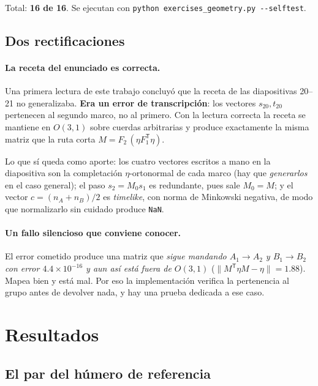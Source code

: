 \documentclass[11pt,a4paper]{article}
\newcommand{\Ot}{\ensuremath{O(3,1)}}
\begin{document}
\noindent Total: \textbf{16 de 16}. Se ejecutan con
\texttt{python exercises\_geometry.py -{}-selftest}.

\subsection{Dos rectificaciones}

\paragraph{La receta del enunciado es correcta.} Una primera lectura de este trabajo
concluyó que la receta de las diapositivas 20--21 no generalizaba. \textbf{Era un error de
transcripción}: los vectores $s_{20}, t_{20}$ pertenecen al segundo marco, no al primero.
Con la lectura correcta la receta se mantiene en \Ot{} sobre cuerdas arbitrarias y produce
exactamente la misma matriz que la ruta corta $M = F_2\,(\eta F_1^{\mathsf T} \eta)$.

Lo que sí queda como aporte: los cuatro vectores escritos a mano en la diapositiva son la
completación $\eta$-ortonormal de cada marco (hay que \emph{generarlos} en el caso general);
el paso $s_2 = M_0 s_1$ es redundante, pues sale $M_0 = M$; y el vector
$c = (n_A + n_B)/2$ es \emph{timelike}, con norma de Minkowski negativa, de modo que
normalizarlo sin cuidado produce \texttt{NaN}.

\paragraph{Un fallo silencioso que conviene conocer.} El error cometido produce una matriz
que \emph{sigue mandando $A_1 \to A_2$ y $B_1 \to B_2$ con error $4.4\times10^{-16}$ y aun
así está fuera de \Ot} ($\lVert M^{\mathsf T}\eta M - \eta\rVert = 1.88$). Mapea bien y está
mal. Por eso la implementación verifica la pertenencia al grupo antes de devolver nada, y
hay una prueba dedicada a ese caso.

\section{Resultados}

\subsection{El par del húmero de referencia}
\end{document}
